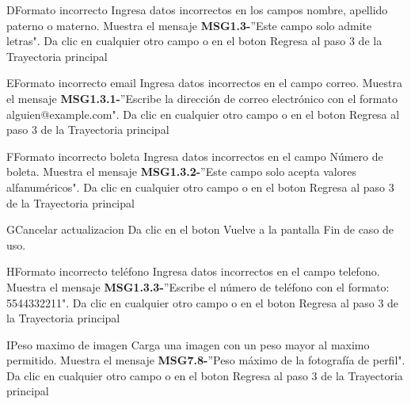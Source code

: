 \begin{UCtrayectoriaA}{D}{Formato incorrecto}
	\UCpaso[\UCactor] Ingresa datos incorrectos en los campos nombre, apellido paterno o materno.
	\UCpaso Muestra el mensaje {\bf MSG1.3-}''Este campo solo admite letras".
	\UCpaso[\UCactor] Da clic en cualquier otro campo o en el boton 
	\UCpaso Regresa al paso 3 de la Trayectoria principal
\end{UCtrayectoriaA}

\begin{UCtrayectoriaA}{E}{Formato incorrecto email}
	\UCpaso[\UCactor] Ingresa datos incorrectos en el campo correo.
	\UCpaso Muestra el mensaje {\bf MSG1.3.1-}''Escribe la dirección de correo electrónico con el formato alguien@example.com".
	\UCpaso[\UCactor] Da clic en cualquier otro campo o en el boton 
	\UCpaso Regresa al paso 3 de la Trayectoria principal
\end{UCtrayectoriaA}

\begin{UCtrayectoriaA}{F}{Formato incorrecto boleta}
	\UCpaso[\UCactor] Ingresa datos incorrectos en el campo Número de boleta.
	\UCpaso Muestra el mensaje {\bf MSG1.3.2-}''Este campo solo acepta valores alfanuméricos".
	\UCpaso[\UCactor] Da clic en cualquier otro campo o en el boton 
	\UCpaso Regresa al paso 3 de la Trayectoria principal
\end{UCtrayectoriaA}

\begin{UCtrayectoriaA}{G}{Cancelar actualizacion}
	\UCpaso[\UCactor] Da clic en el boton 
	\UCpaso Vuelve a la pantalla 
	\UCpaso Fin de caso de uso.
\end{UCtrayectoriaA}

\begin{UCtrayectoriaA}{H}{Formato incorrecto teléfono}
	\UCpaso[\UCactor] Ingresa datos incorrectos en el campo telefono.
	\UCpaso Muestra el mensaje {\bf MSG1.3.3-}''Escribe el número de teléfono con el formato: 5544332211".
	\UCpaso[\UCactor] Da clic en cualquier otro campo o en el boton 
	\UCpaso Regresa al paso 3 de la Trayectoria principal
\end{UCtrayectoriaA}

\begin{UCtrayectoriaA}{I}{Peso maximo de imagen}
	\UCpaso[\UCactor] Carga una imagen con un peso mayor al maximo permitido.
	\UCpaso Muestra el mensaje {\bf MSG7.8-}''Peso máximo de la fotografía de perfil".
	\UCpaso[\UCactor] Da clic en cualquier otro campo o en el boton 
	\UCpaso Regresa al paso 3 de la Trayectoria principal
\end{UCtrayectoriaA}

